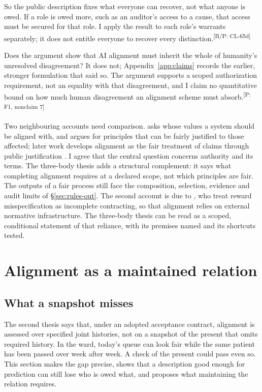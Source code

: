 \documentclass[pdflatex,sn-basic]{sn-jnl}%
\newcommand{\slot}[1]{}%
\newcommand{\claim}[2]{\ifannotated\textsuperscript{\textcolor{blue!60!black}{\tiny[#1: #2]}}\fi}
\begin{document}
So the public description fixes what everyone can recover, not what anyone is owed. If a role is owed more, such as an auditor's access to a cause, that access must be secured for that role. I apply the result to each role's warrants separately; it does not entitle everyone to recover every distinction.\claim{B/P}{CL-65d}

\slot{3.5}
Does the argument show that AI alignment must inherit the whole of humanity's unresolved disagreement? It does not; Appendix~\ref{app:claims} records the earlier, stronger formulation that said so. The argument supports a scoped authorization requirement, not an equality with that disagreement, and I claim no quantitative bound on how much human disagreement an alignment scheme must absorb.\claim{P}{F1, nonclaim 7}

Two neighbouring accounts need comparison. \citet{gabriel2020} asks whose values a system should be aligned with, and argues for principles that can be fairly justified to those affected; later work develops alignment as the fair treatment of claims through public justification \citep{gabriel2025keeling}. I agree that the central question concerns authority and its terms. The three-body thesis adds a structural complement: it says what completing alignment requires at a declared scope, not which principles are fair. The outputs of a fair process still face the composition, selection, evidence and audit limits of \S\ref{sec:rules-out}. The second account is due to \citet{hadfieldmenell2019incomplete}, who treat reward misspecification as incomplete contracting, so that alignment relies on external normative infrastructure. The three-body thesis can be read as a scoped, conditional statement of that reliance, with its premises named and its shortcuts tested.

\section{Alignment as a maintained relation}\label{sec:maintained}

\subsection{What a snapshot misses}\label{sec:snapshot}

\slot{4.1}
The second thesis says that, under an adopted acceptance contract, alignment is assessed over specified joint histories, not on a snapshot of the present that omits required history. In the ward, today's queue can look fair while the same patient has been passed over week after week. A check of the present could pass even so. This section makes the gap precise, shows that a description good enough for prediction can still lose who is owed what, and proposes what maintaining the relation requires.
\end{document}
